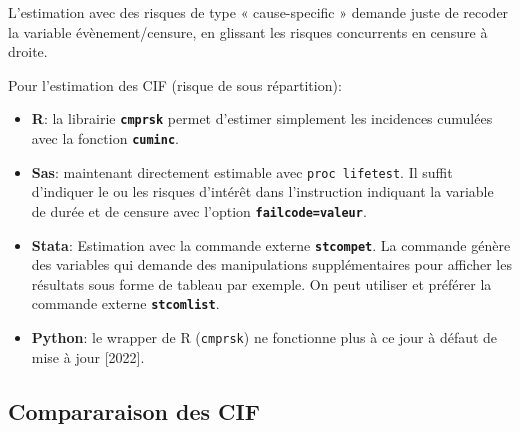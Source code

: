 \documentclass[
  12pt,
  letterpaper,
  DIV=11,
  numbers=noendperiod,
  onepage,
  openany]{scrreprt}
\begin{document}
\begin{tcolorbox}[enhanced jigsaw, arc=.35mm, bottomrule=.15mm, titlerule=0mm, colbacktitle=quarto-callout-tip-color!10!white, left=2mm, opacitybacktitle=0.6, toprule=.15mm, title=\textcolor{quarto-callout-tip-color}{\faLightbulb}\hspace{0.5em}{\textbf{R-Stata-Sas-Python}}, colframe=quarto-callout-tip-color-frame, breakable, coltitle=black, opacityback=0, toptitle=1mm, bottomtitle=1mm, rightrule=.15mm, leftrule=.75mm, colback=white]

L'estimation avec des risques de type « cause-specific » demande juste
de recoder la variable évènement/censure, en glissant les risques
concurrents en censure à droite.

Pour l'estimation des CIF (risque de sous répartition):

\begin{itemize}
\item
  \textbf{R}: la librairie \textbf{\texttt{cmprsk}} permet d'estimer
  simplement les incidences cumulées avec la fonction
  \textbf{\texttt{cuminc}}.
\item
  \textbf{Sas}: maintenant directement estimable avec
  \texttt{proc\ lifetest}. Il suffit d'indiquer le ou les risques
  d'intérêt dans l'instruction indiquant la variable de durée et de
  censure avec l'option \textbf{\texttt{failcode=valeur}}.
\item
  \textbf{Stata}: Estimation avec la commande externe
  \textbf{\texttt{stcompet}}. La commande génère des variables qui
  demande des manipulations supplémentaires pour afficher les résultats
  sous forme de tableau par exemple. On peut utiliser et préférer la
  commande externe \textbf{\texttt{stcomlist}}.
\item
  \textbf{Python}: le wrapper de R (\texttt{cmprsk}) ne fonctionne plus
  à ce jour à défaut de mise à jour {[}2022{]}.
\end{itemize}

\end{tcolorbox}

\hypertarget{compararaison-des-cif}{%
\subsection{Compararaison des CIF}\label{compararaison-des-cif}}
\end{document}
